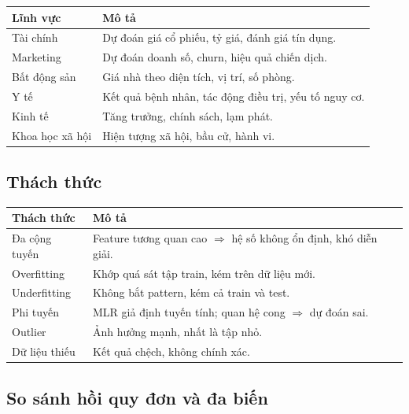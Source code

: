 \begin{ynghia}[title={Ứng dụng MLR}]
\begin{center}
\small
\begin{tabular}{|l|p{8cm}|}
\hline
\textbf{Lĩnh vực} & \textbf{Mô tả} \\
\hline
Tài chính & Dự đoán giá cổ phiếu, tỷ giá, đánh giá tín dụng. \\
Marketing & Dự đoán doanh số, churn, hiệu quả chiến dịch. \\
Bất động sản & Giá nhà theo diện tích, vị trí, số phòng. \\
Y tế & Kết quả bệnh nhân, tác động điều trị, yếu tố nguy cơ. \\
Kinh tế & Tăng trưởng, chính sách, lạm phát. \\
Khoa học xã hội & Hiện tượng xã hội, bầu cử, hành vi. \\
\hline
\end{tabular}
\end{center}
\end{ynghia}

\subsection{Thách thức}

\begin{luuy}[title={Thách thức MLR}]
\begin{center}
\small
\begin{tabular}{|l|p{8cm}|}
\hline
\textbf{Thách thức} & \textbf{Mô tả} \\
\hline
Đa cộng tuyến & Feature tương quan cao $\Rightarrow$ hệ số không ổn định, khó diễn giải. \\
Overfitting & Khớp quá sát tập train, kém trên dữ liệu mới. \\
Underfitting & Không bắt pattern, kém cả train và test. \\
Phi tuyến & MLR giả định tuyến tính; quan hệ cong $\Rightarrow$ dự đoán sai. \\
Outlier & Ảnh hưởng mạnh, nhất là tập nhỏ. \\
Dữ liệu thiếu & Kết quả chệch, không chính xác. \\
\hline
\end{tabular}
\end{center}
\end{luuy}

\subsection{So sánh hồi quy đơn và đa biến}


